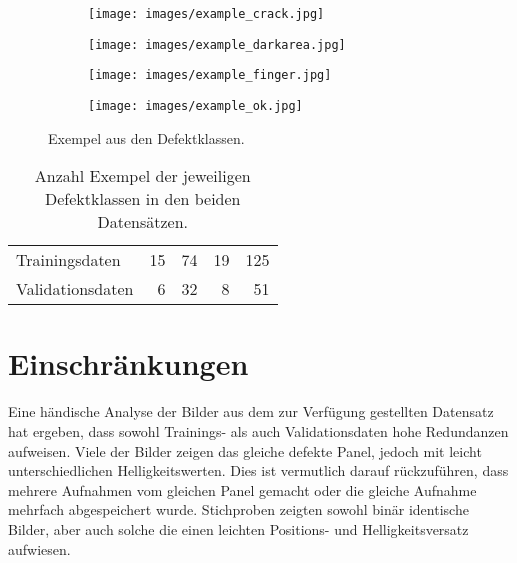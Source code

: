 \begin{figure}
    \centering
    \begin{subfigure}{0.245\textwidth}
        \texttt{[image: images/example\_crack.jpg]}
        \caption{}
    \end{subfigure}
    \begin{subfigure}{0.245\textwidth}
        \texttt{[image: images/example\_darkarea.jpg]}
        \caption{}
    \end{subfigure}
    \begin{subfigure}{0.245\textwidth}
        \texttt{[image: images/example\_finger.jpg]}
        \caption{}
    \end{subfigure}
    \begin{subfigure}{0.245\textwidth}
        \texttt{[image: images/example\_ok.jpg]}
        \caption{}
    \end{subfigure}
    \caption{Exempel aus den Defektklassen.\label{fig:example_defects}}
\end{figure}

\begin{table}
    \centering
    \caption{Anzahl Exempel der jeweiligen Defektklassen in den beiden Datensätzen.\label{tbl:datasets}}
    \begin{tabular}{l r r r r}
        \toprule
                         & {} & {} & {} & {} \\
        \midrule
        Trainingsdaten   & 15             & 74                & 19              & 125         \\
        Validationsdaten & 6              & 32                & 8               & 51          \\
        \bottomrule
    \end{tabular}
\end{table}

\section{Einschränkungen}

Eine händische Analyse der Bilder aus dem zur Verfügung gestellten Datensatz hat ergeben, dass sowohl Trainings- als auch Validationsdaten hohe Redundanzen aufweisen. Viele der Bilder zeigen das gleiche defekte Panel, jedoch mit leicht unterschiedlichen Helligkeitswerten. Dies ist vermutlich darauf rückzuführen, dass mehrere Aufnahmen vom gleichen Panel gemacht oder die gleiche Aufnahme mehrfach abgespeichert wurde. Stichproben zeigten sowohl binär identische Bilder, aber auch solche die einen leichten Positions- und Helligkeitsversatz aufwiesen.
